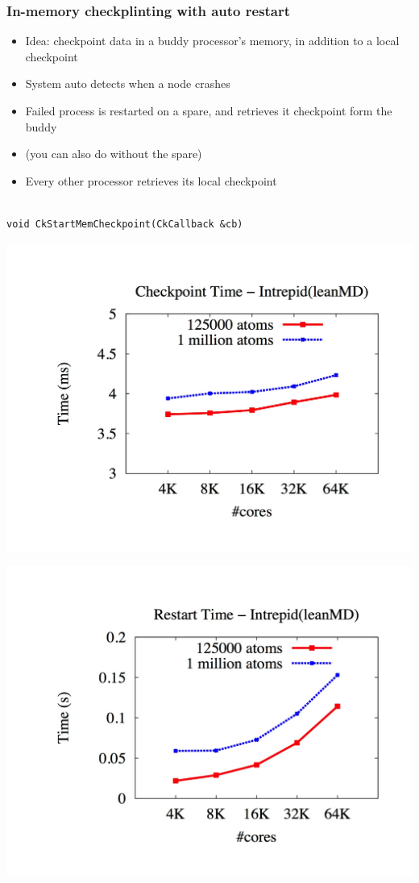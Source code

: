 \begin{frame}[fragile]
  \frametitle{In-memory checkplinting with auto restart}
\begin{itemize}

\item Idea: checkpoint data in a buddy processor's memory, in addition
  to a local checkpoint
\item System auto detects when a node crashes
\item  Failed process is restarted on a spare, and retrieves it
  checkpoint form the buddy
\item (you can also do without the spare)
\item Every other processor retrieves its local checkpoint 
\end{itemize}

 \begin{lstlisting}[basicstyle=\footnotesize]

void CkStartMemCheckpoint(CkCallback &cb)
\end{lstlisting}

\end{frame}

\begin{frame}[fragile]
  \includegraphics[width=\textwidth]{figures/checkpointTimeIntrepid.png}
\end{frame}

\begin{frame}[fragile]
  \includegraphics[width=\textwidth]{figures/restartTimeIntrepid.png}
\end{frame}

